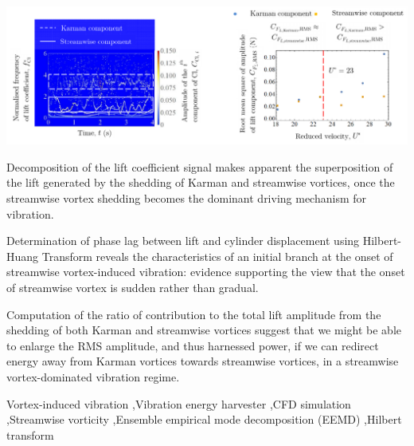 \documentclass[a4paper,fleqn]{cas-sc}
\begin{document}
\begin{graphicalabstract}
  \includegraphics[width=1\textwidth]{figs/graphicalAbstract}
\end{graphicalabstract}

\begin{highlights}
\item Decomposition of the lift coefficient signal makes apparent the superposition of the lift generated by the shedding of Karman and streamwise vortices, once the streamwise vortex shedding becomes the dominant driving mechanism for vibration.
\item Determination of phase lag between lift and cylinder displacement using Hilbert-Huang Transform reveals the characteristics of an initial branch at the onset of streamwise vortex-induced vibration: evidence supporting the view that the onset of streamwise vortex is sudden rather than gradual.
\item Computation of the ratio of contribution to the total lift amplitude from the shedding of both Karman and streamwise vortices suggest that we might be able to enlarge the RMS amplitude, and thus harnessed power, if we can redirect energy away from Karman vortices towards streamwise vortices, in a streamwise vortex-dominated vibration regime.
\end{highlights}

\begin{keywords}
  Vortex-induced vibration \sep Vibration energy harvester \sep CFD simulation \sep Streamwise vorticity \sep Ensemble empirical mode decomposition (EEMD) \sep Hilbert transform
\end{keywords}


\maketitle

\doublespacing
\end{document}

